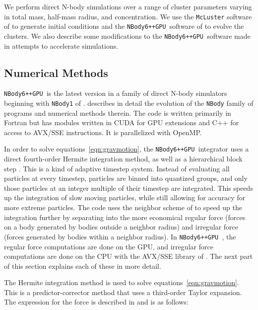 \documentclass[preprint1]{aastex}
\newcommand\nbody{\texttt{NBody6++GPU }}
\numberwithin{equation}{section}
\begin{document}
We perform direct N-body simulations over a range of cluster parameters varying in total mass, half-mass radius, and concentration.  We use the \texttt{McLuster} software of \citet{2011Kupper} to generate initial conditions and the \nbody software of \citet{2015Wang} to evolve the clusters. We also describe some modifications to the \nbody software made in attempts to accelerate simulations.

\subsection{Numerical Methods}
\nbody is the latest version in a family of direct N-body simulators beginning with \texttt{NBody1} of \citet{1963Aarseth}. \citet{1999Aarseth} describes in detail the evolution of the \texttt{NBody} family of programs and numerical methods therein.  The code is written primarily in Fortran but has modules written in CUDA for GPU extensions and C++ for access to AVX/SSE instructions. It is parallelized with OpenMP.

In order to solve equations~\ref{eqn:gravmotion}, the \nbody integrator uses a direct fourth-order Hermite integration method, as well as a hierarchical block step \citep[][and refs within]{2015Wang}. This is a kind of adaptive timestep system. Instead of evaluating all particles at every timestep, particles are binned into quantized groups, and only those particles at an integer multiple of their timestep are integrated. This speeds up the integration of slow moving particles, while still allowing for accuracy for more extreme particles. The code uses the neighbor scheme of \citet{1973Ahmad} to speed up the integration further by separating into the more economical regular force (forces on a body generated by bodies outside a neighbor radius) and irregular force (forces generated by bodies within a neighbor radius). In \nbody, the regular force computations are done on the GPU, and irregular force computations are done on the CPU with the AVX/SSE library of \citet{2012Nitadori}. The next part of this section explains each of these in more detail.

The Hermite integration method is used to solve equations~\ref{eqn:gravmotion}.  This is a predictor-corrector method that uses a third-order Taylor expansion.  The expression for the force is described in \citet{1999Aarseth} and is as follows:
\end{document}
